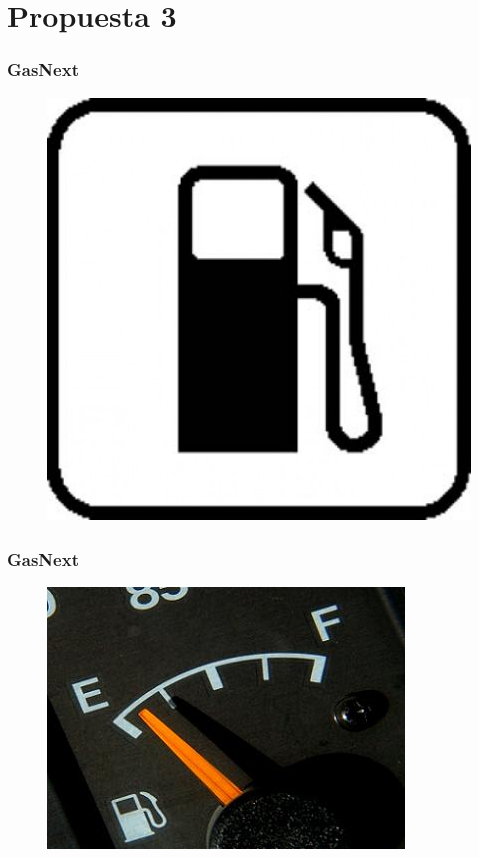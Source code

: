\documentclass{beamer}
\begin{document}
\section{Propuesta 3}
\begin{frame}[allowframebreaks]
\frametitle{GasNext}
\begin{figure}[h]
\centering
\includegraphics[height=0.5\textheight]{Gasolinera}
\end{figure}
\end{frame}

\begin{frame}[allowframbreaks]
\frametitle{GasNext}
\begin{figure}[h]
\centering
\includegraphics[height=0.5\textheight]{Casisingasolina}
\end{figure}
\end{frame}
\end{document}
